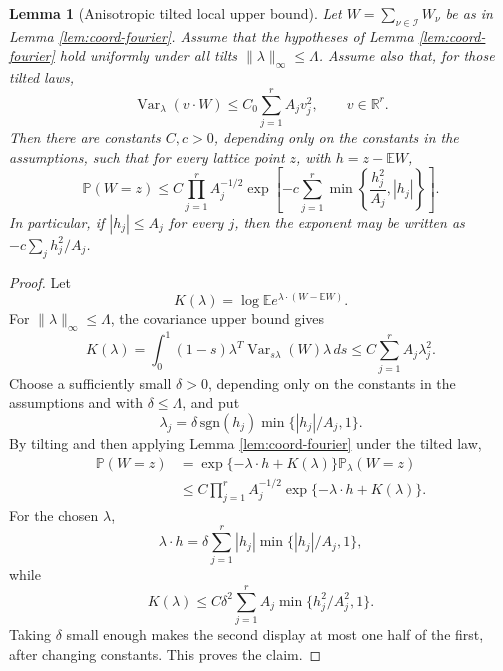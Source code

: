 \documentclass[11pt]{article}
\newtheorem{lemma}[theorem]{Lemma}
\theoremstyle{remark}
\newcommand{\Pp}{\mathbb P}
\newcommand{\Ee}{\mathbb E}
\newcommand{\Rr}{\mathbb R}
\newcommand{\Var}{\operatorname{Var}}
\newcommand{\dd}{\,d}
\begin{document}
\begin{lemma}[Anisotropic tilted local upper bound]\label{lem:anisotropic-tilted-upper}
Let \(W=\sum_{\nu\in\mathcal I}W_\nu\) be as in Lemma \ref{lem:coord-fourier}.  Assume that the hypotheses of Lemma \ref{lem:coord-fourier} hold uniformly under all tilts \(\|\lambda\|_\infty\le\Lambda\).  Assume also that, for those tilted laws,
\[
        \Var_\lambda(v\cdot W)
        \le C_0\sum_{j=1}^r A_jv_j^2,
        \qquad v\in\Rr^r .
\]
Then there are constants \(C,c>0\), depending only on the constants in the assumptions, such that for every lattice point \(z\), with
\(h=z-\Ee W\),
\[
        \Pp(W=z)
        \le C\prod_{j=1}^r A_j^{-1/2}
        \exp\left[-c\sum_{j=1}^r
        \min\left\{\frac{h_j^2}{A_j}, |h_j|\right\}\right].
\]
In particular, if \(|h_j|\le A_j\) for every \(j\), then the exponent may be written as
\(-c\sum_j h_j^2/A_j\).
\end{lemma}

\begin{proof}
Let
\[
        K(\lambda)=\log\Ee e^{\lambda\cdot(W-\Ee W)}.
\]
For \(\|\lambda\|_\infty\le\Lambda\), the covariance upper bound gives
\[
        K(\lambda)
        =\int_0^1(1-s)\lambda^T
        \Var_{s\lambda}(W)\lambda\dd s
        \le C\sum_{j=1}^r A_j\lambda_j^2 .
\]
Choose a sufficiently small \(\delta>0\), depending only on the constants in the assumptions and with \(\delta\le\Lambda\), and put
\[
        \lambda_j=\delta\,\mathrm{sgn}(h_j)
        \min\{|h_j|/A_j,1\}.
\]
By tilting and then applying Lemma \ref{lem:coord-fourier} under the tilted law,
\[
\begin{aligned}
        \Pp(W=z)
        &=\exp\{-\lambda\cdot h+K(\lambda)\}
          \Pp_\lambda(W=z) \\
        &\le C\prod_{j=1}^r A_j^{-1/2}
        \exp\{-\lambda\cdot h+K(\lambda)\}.
\end{aligned}
\]
For the chosen \(\lambda\),
\[
        \lambda\cdot h
        =\delta\sum_{j=1}^r |h_j|\min\{|h_j|/A_j,1\},
\]
while
\[
        K(\lambda)
        \le C\delta^2\sum_{j=1}^r
        A_j\min\{h_j^2/A_j^2,1\}.
\]
Taking \(\delta\) small enough makes the second display at most one half of the first, after changing constants.  This proves the claim.
\end{proof}
\end{document}
